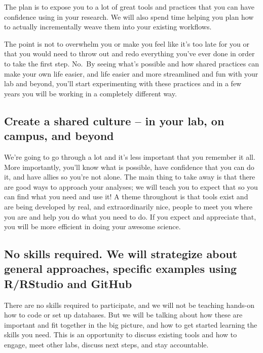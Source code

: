 \documentclass[
  letterpaper,
  DIV=11,
  numbers=noendperiod]{scrreprt}
\begin{document}
The plan is to expose you to a lot of great tools and practices that you
can have confidence using in your research. We will also spend time
helping you plan how to actually incrementally weave them into your
existing workflows.

The point is not to overwhelm you or make you feel like it's too late
for you or that you would need to throw out and redo everything you've
ever done in order to take the first step. No.~By seeing what's possible
and how shared practices can make your own life easier, and life easier
and more streamlined and fun with your lab and beyond, you'll start
experimenting with these practices and in a few years you will be
working in a completely different way.

\hypertarget{create-a-shared-culture-in-your-lab-on-campus-and-beyond}{%
\subsection{Create a shared culture -- in your lab, on campus, and
beyond}\label{create-a-shared-culture-in-your-lab-on-campus-and-beyond}}

We're going to go through a lot and it's less important that you
remember it all. More importantly, you'll know what is possible, have
confidence that you can do it, and have allies so you're not alone. The
main thing to take away is that there are good ways to approach your
analyses; we will teach you to expect that so you can find what you need
and use it! A theme throughout is that tools exist and are being
developed by real, and extraordinarily nice, people to meet you where
you are and help you do what you need to do. If you expect and
appreciate that, you will be more efficient in doing your awesome
science.

\hypertarget{no-skills-required.-we-will-strategize-about-general-approaches-specific-examples-using-rrstudio-and-github}{%
\subsection{No skills required. We will strategize about general
approaches, specific examples using R/RStudio and
GitHub}\label{no-skills-required.-we-will-strategize-about-general-approaches-specific-examples-using-rrstudio-and-github}}

There are no skills required to participate, and we will not be teaching
hands-on how to code or set up databases. But we will be talking about
how these are important and fit together in the big picture, and how to
get started learning the skills you need. This is an opportunity to
discuss existing tools and how to engage, meet other labs, discuss next
steps, and stay accountable.
\end{document}
